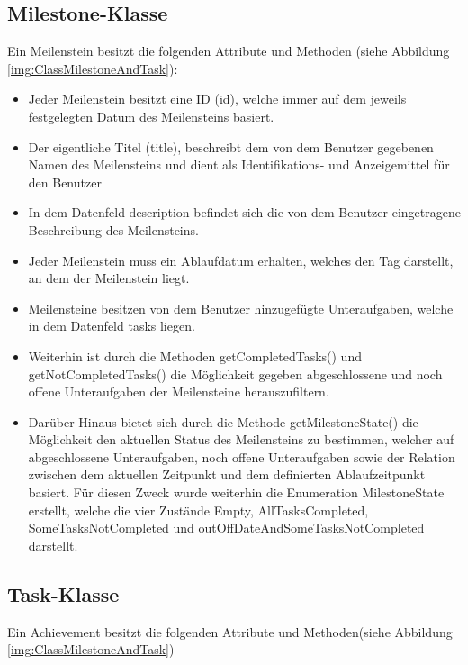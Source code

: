 \documentclass[bibliography=totoc,listof=totoc,BCOR=5mm,DIV=12,oneside]{scrbook}
\begin{document}
\subsection{Milestone-Klasse}
\par Ein Meilenstein besitzt die folgenden Attribute und Methoden (siehe Abbildung \ref{img:ClassMilestoneAndTask}):
\begin{itemize}
\item \par Jeder Meilenstein besitzt eine ID (id), welche immer auf dem jeweils festgelegten Datum des Meilensteins basiert.
\item \par Der eigentliche Titel (title), beschreibt dem von dem Benutzer gegebenen Namen des Meilensteins und dient als Identifikations- und Anzeigemittel für den Benutzer
\item \par In dem Datenfeld description befindet sich die von dem Benutzer eingetragene Beschreibung des Meilensteins.
\item \par Jeder Meilenstein muss ein Ablaufdatum erhalten, welches den Tag darstellt, an dem der Meilenstein liegt.
\item \par Meilensteine besitzen von dem Benutzer hinzugefügte Unteraufgaben, welche in dem Datenfeld tasks liegen.
\item \par Weiterhin ist durch die Methoden getCompletedTasks() und getNotCompletedTasks() die Möglichkeit gegeben abgeschlossene und noch offene Unteraufgaben der Meilensteine herauszufiltern.
\item \par Darüber Hinaus bietet sich durch die Methode getMilestoneState() die Möglichkeit den aktuellen Status des Meilensteins zu bestimmen, welcher auf abgeschlossene Unteraufgaben, noch offene Unteraufgaben sowie der Relation zwischen dem aktuellen Zeitpunkt und dem definierten Ablaufzeitpunkt basiert. Für diesen Zweck wurde weiterhin die Enumeration MilestoneState erstellt, welche die vier Zustände Empty, AllTasksCompleted, SomeTasksNotCompleted und outOffDateAndSomeTasksNotCompleted darstellt.
\end{itemize}


\subsection{Task-Klasse}
\par Ein Achievement besitzt die folgenden Attribute und Methoden(siehe Abbildung \ref{img:ClassMilestoneAndTask})
\end{document}
